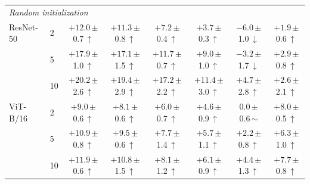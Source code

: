 \begin{table}[htbp]
\begin{tabular}{llcccccc}
\midrule
\multicolumn{8}{l}{\textit{Random initialization}} \\
ResNet-50 & 2 & $+12.0$\,{\scriptsize$\pm$0.7}\,$\uparrow$ & $+11.3$\,{\scriptsize$\pm$0.8}\,$\uparrow$ & $+7.2$\,{\scriptsize$\pm$0.4}\,$\uparrow$ & $+3.7$\,{\scriptsize$\pm$0.3}\,$\uparrow$ & $-6.0$\,{\scriptsize$\pm$1.0}\,$\downarrow$ & $+1.9$\,{\scriptsize$\pm$0.6}\,$\uparrow$ \\
 & 5 & $+17.9$\,{\scriptsize$\pm$1.0}\,$\uparrow$ & $+17.1$\,{\scriptsize$\pm$1.5}\,$\uparrow$ & $+11.7$\,{\scriptsize$\pm$0.7}\,$\uparrow$ & $+9.0$\,{\scriptsize$\pm$1.0}\,$\uparrow$ & $-3.2$\,{\scriptsize$\pm$1.7}\,$\downarrow$ & $+2.9$\,{\scriptsize$\pm$0.8}\,$\uparrow$ \\
 & 10 & $+20.2$\,{\scriptsize$\pm$2.6}\,$\uparrow$ & $+19.4$\,{\scriptsize$\pm$2.9}\,$\uparrow$ & $+17.2$\,{\scriptsize$\pm$2.2}\,$\uparrow$ & $+11.4$\,{\scriptsize$\pm$3.0}\,$\uparrow$ & $+4.7$\,{\scriptsize$\pm$2.8}\,$\uparrow$ & $+2.6$\,{\scriptsize$\pm$2.1}\,$\uparrow$ \\
\addlinespace[2pt]
ViT-B/16 & 2 & $+9.0$\,{\scriptsize$\pm$0.6}\,$\uparrow$ & $+8.1$\,{\scriptsize$\pm$0.6}\,$\uparrow$ & $+6.0$\,{\scriptsize$\pm$0.7}\,$\uparrow$ & $+4.6$\,{\scriptsize$\pm$0.9}\,$\uparrow$ & $0.0$\,{\scriptsize$\pm$0.6}\,$\sim$ & $+8.0$\,{\scriptsize$\pm$0.5}\,$\uparrow$ \\
 & 5 & $+10.9$\,{\scriptsize$\pm$0.8}\,$\uparrow$ & $+9.5$\,{\scriptsize$\pm$0.6}\,$\uparrow$ & $+7.7$\,{\scriptsize$\pm$1.4}\,$\uparrow$ & $+5.7$\,{\scriptsize$\pm$1.1}\,$\uparrow$ & $+2.2$\,{\scriptsize$\pm$0.8}\,$\uparrow$ & $+6.3$\,{\scriptsize$\pm$1.0}\,$\uparrow$ \\
 & 10 & $+11.9$\,{\scriptsize$\pm$0.6}\,$\uparrow$ & $+10.8$\,{\scriptsize$\pm$1.5}\,$\uparrow$ & $+8.1$\,{\scriptsize$\pm$1.2}\,$\uparrow$ & $+6.1$\,{\scriptsize$\pm$0.9}\,$\uparrow$ & $+4.4$\,{\scriptsize$\pm$1.3}\,$\uparrow$ & $+7.7$\,{\scriptsize$\pm$0.8}\,$\uparrow$ \\
\bottomrule
\end{tabular}
\end{table}
